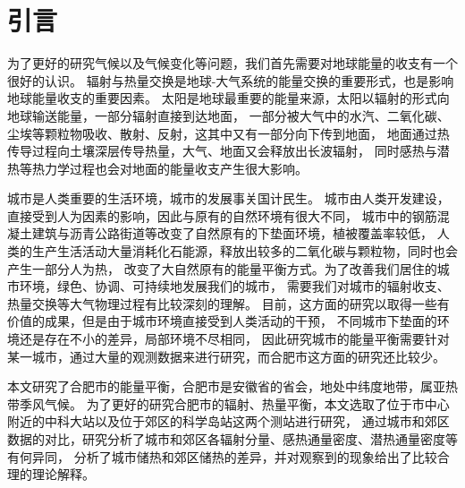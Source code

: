 \chapter{引言}
为了更好的研究气候以及气候变化等问题，我们首先需要对地球能量的收支有一个很好的认识。
辐射与热量交换是地球-大气系统的能量交换的重要形式，也是影响地球能量收支的重要因素。\cite{Liou2002}
太阳是地球最重要的能量来源，太阳以辐射的形式向地球输送能量，一部分辐射直接到达地面，
一部分被大气中的水汽、二氧化碳、尘埃等颗粒物吸收、散射、反射，这其中又有一部分向下传到地面，
地面通过热传导过程向土壤深层传导热量，大气、地面又会释放出长波辐射，
同时感热与潜热等热力学过程也会对地面的能量收支产生很大影响。\cite{tagkey2006}

城市是人类重要的生活环境，城市的发展事关国计民生。
城市由人类开发建设，直接受到人为因素的影响，因此与原有的自然环境有很大不同，
城市中的钢筋混凝土建筑与沥青公路街道等改变了自然原有的下垫面环境，植被覆盖率较低，
人类的生产生活活动大量消耗化石能源，释放出较多的二氧化碳与颗粒物，同时也会产生一部分人为热，
改变了大自然原有的能量平衡方式。为了改善我们居住的城市环境，绿色、协调、可持续地发展我们的城市，
需要我们对城市的辐射收支、热量交换等大气物理过程有比较深刻的理解。
目前，这方面的研究以取得一些有价值的成果，但是由于城市环境直接受到人类活动的干预\cite{佟华2004城市人为热对北京热环境的影响}，
不同城市下垫面的环境还是存在不小的差异，局部环境不尽相同，
因此研究城市的能量平衡需要针对某一城市，通过大量的观测数据来进行研究，而合肥市这方面的研究还比较少。

本文研究了合肥市的能量平衡，合肥市是安徽省的省会，地处中纬度地带，属亚热带季风气候。
为了更好的研究合肥市的辐射、热量平衡，本文选取了位于市中心附近的中科大站以及位于郊区的科学岛站这两个测站进行研究，
通过城市和郊区数据的对比，研究分析了城市和郊区各辐射分量、感热通量密度、潜热通量密度等有何异同，
分析了城市储热和郊区储热的差异，并对观察到的现象给出了比较合理的理论解释。

